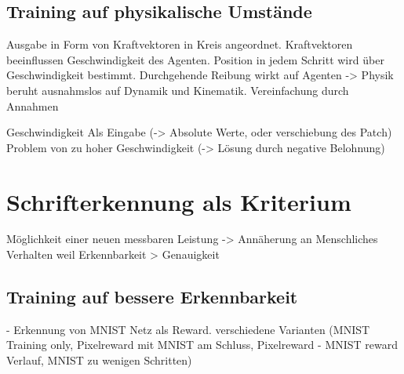 \subsection*{Training auf physikalische Umstände}
Ausgabe in Form von Kraftvektoren in Kreis angeordnet. Kraftvektoren
beeinflussen Geschwindigkeit des Agenten. Position in jedem Schritt wird über
Geschwindigkeit bestimmt. Durchgehende Reibung wirkt auf Agenten
-> Physik beruht ausnahmslos auf Dynamik und Kinematik. Vereinfachung durch Annahmen

Geschwindigkeit Als Eingabe (-> Absolute Werte, oder verschiebung des Patch)
Problem von zu hoher Geschwindigkeit (-> Lösung durch negative Belohnung)


\section{Schrifterkennung als Kriterium}
Möglichkeit einer neuen messbaren Leistung
-> Annäherung an Menschliches Verhalten weil Erkennbarkeit > Genauigkeit


\subsection*{Training auf bessere Erkennbarkeit}
- Erkennung von MNIST Netz als Reward. 
verschiedene Varianten (MNIST Training only, Pixelreward mit MNIST am Schluss, Pixelreward - MNIST reward Verlauf, MNIST zu wenigen Schritten)


